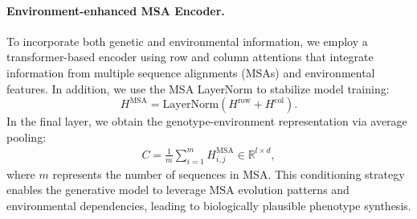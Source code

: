 

\paragraph{Environment-enhanced MSA Encoder.}
To incorporate both genetic and environmental information, we employ a transformer-based encoder using row and column attentions that integrate information from multiple sequence alignments (MSAs) and environmental features. In addition, we use the MSA LayerNorm to stabilize model training: 
\begin{equation}
    H^{\text{MSA}} = \text{LayerNorm} \left( H^{\text{row}} + H^{\text{col}} \right).
\end{equation}
In the final layer, we obtain the genotype-environment representation via average pooling:
\begin{align}
\label{eq:condition}
C = \frac{1}{m} \sum_{i=1}^{m} H^{\text{MSA}}_{i,j} \in \mathbb{R}^{l\times d},
\end{align}
where $m$ represents the number of sequences in MSA.
This conditioning strategy enables the generative model to leverage MSA evolution patterns and environmental dependencies, leading to biologically plausible phenotype synthesis.







